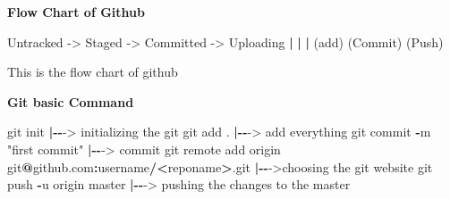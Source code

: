 \documentclass[
]{article}
\newenvironment{Shaded}{\begin{snugshade}}{\end{snugshade}}
\newcommand{\ErrorTok}[1]{\textcolor[rgb]{0.64,0.00,0.00}{\textbf{#1}}}
\newcommand{\NormalTok}[1]{#1}
\newcommand{\OtherTok}[1]{\textcolor[rgb]{0.56,0.35,0.01}{#1}}
\newcommand{\SpecialCharTok}[1]{\textcolor[rgb]{0.81,0.36,0.00}{\textbf{#1}}}
\newcommand{\StringTok}[1]{\textcolor[rgb]{0.31,0.60,0.02}{#1}}
\begin{document}
\textbf{Flow Chart of Github}

\begin{Shaded}
\begin{Highlighting}[]
\NormalTok{Untracked }\OtherTok{{-}\textgreater{}}\NormalTok{ Staged }\OtherTok{{-}\textgreater{}}\NormalTok{ Committed }\OtherTok{{-}\textgreater{}}\NormalTok{ Uploading}
          \SpecialCharTok{|}         \ErrorTok{|}            \ErrorTok{|}
\NormalTok{        (add)    (Commit)      (Push)}
\end{Highlighting}
\end{Shaded}

This is the flow chart of github

\textbf{Git basic Command}

\begin{Shaded}
\begin{Highlighting}[]
\NormalTok{git init                     }\SpecialCharTok{|{-}{-}}\OtherTok{{-}\textgreater{}}\NormalTok{ initializing the git}
\NormalTok{git add .                    }\SpecialCharTok{|{-}{-}}\OtherTok{{-}\textgreater{}}\NormalTok{ add everything}
\NormalTok{git commit }\SpecialCharTok{{-}}\NormalTok{m }\StringTok{"first commit"} \SpecialCharTok{|{-}{-}}\OtherTok{{-}\textgreater{}}\NormalTok{ commit }
\NormalTok{git remote add origin git}\SpecialCharTok{@}\NormalTok{github.com}\SpecialCharTok{:}\NormalTok{username}\SpecialCharTok{/}\ErrorTok{\textless{}}\NormalTok{reponame}\SpecialCharTok{\textgreater{}}\NormalTok{.git }\SpecialCharTok{|{-}{-}}\OtherTok{{-}\textgreater{}}\NormalTok{choosing the git website}
\NormalTok{git push }\SpecialCharTok{{-}}\NormalTok{u origin master   }\SpecialCharTok{|{-}{-}}\OtherTok{{-}\textgreater{}}\NormalTok{ pushing the changes to the master }
\end{Highlighting}
\end{Shaded}
\end{document}
